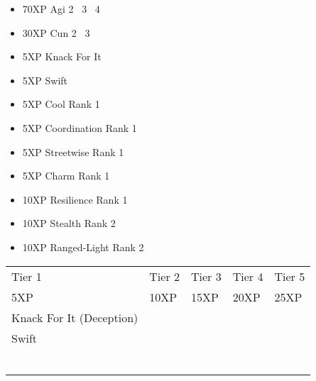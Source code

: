 \documentclass{article}
\begin{document}

\begin{multicols}{2}
\setlength{\columnseprule}{0.3pt}
\begin{itemize}[noitemsep]
\item 70XP Agi 2 \faArrowRight\ 3 \faArrowRight\ 4
\item 30XP Cun 2 \faArrowRight\ 3
\item 5XP Knack For It
\item 5XP Swift
\item 5XP Cool Rank 1
\item 5XP Coordination Rank 1
\item 5XP Streetwise Rank 1
\item 5XP Charm Rank 1
\item 10XP Resilience Rank 1
\item 10XP Stealth Rank 2
\item 10XP Ranged-Light Rank 2
\end{itemize}
\end{multicols}


\vspace*{\fill}

\hfill{}


\pagebreak


\noindent\begin{tabu} to 
\rowfont{\bfseries\sffamily\centering} Tier 1 & Tier 2 & Tier 3 & Tier 4 & Tier 5\\
\rowfont{\small\sffamily\centering} 5XP & 10XP & 15XP & 20XP & 25XP\\
    Knack For It (Deception)\\
Swift &  \\
 &  & \\
 &  & & \\
 &  & & & \\
 &  & & & \\
 &  & & & \\
 &  & & & \\

\end{tabu}
\end{document}
